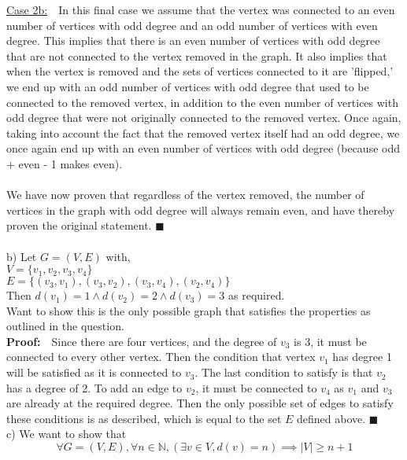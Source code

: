 \documentclass{article}
\newcommand{\N}{\mathbb{N}}
\begin{document}
\begin{enumerate}
	\underline{Case 2b:}\ \ In this final case we assume that the vertex was connected to an even number of vertices with odd degree and an odd number of vertices with even degree. This implies that there is an even number of vertices with odd degree that are not connected to the vertex removed in the graph. It also implies that when the vertex is removed and the sets of vertices connected to it are 'flipped,' we end up with an odd number of vertices with odd degree that used to be connected to the removed vertex, in addition to the even number of vertices with odd degree that were not originally connected to the removed vertex. Once again, taking into account the fact that the removed vertex itself had an odd degree, we once again end up with an even number of vertices with odd degree (because odd + even - 1 makes even). \\\\
	We have now proven that regardless of the vertex removed, the number of vertices in the graph with odd degree will always remain even, and have thereby proven the original statement. \null\hfill $\blacksquare$ \\\\
	
	b)	Let $ G = (V, E)$  with, \\
		$ V = \{ v_1, v_2, v_3, v_4 \}$\\ 
		$ E = \{ (v_3, v_1), (v_3, v_2), (v_3, v_4), (v_2, v_4) \}$ \\
		Then $ d(v_1) = 1 \wedge d(v_2) = 2 \wedge d(v_3) = 3$ as required. \\
		
		Want to show this is the only possible graph that satisfies the properties as outlined in the question. \\
		
		\textbf{Proof:}\ \ Since there are four vertices, and the degree of $v_3$ is 3, it must be connected to every other vertex. Then the condition that vertex $v_1$ has degree 1 will be satisfied as it is connected to $v_3$. The last condition to satisfy is that $v_2$ has a degree of 2. To add an edge to $v_2$, it must be connected to $v_4$ as $v_1$ and $v_3$ are already at the required degree. Then the only possible set of edges to satisfy these conditions is as described, which is equal to the set $E$ defined above. \null\hfill $\blacksquare$\\
		
	
	c) We want to show that $$\forall G = (V, E), \forall n \in \N, (\exists v \in V, d(v) = n) \implies |V| \geq n+1$$
	

\end{enumerate}
\end{document}
